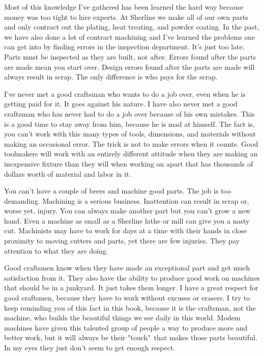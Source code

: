 
Most of this knowledge I've gathered has been learned the hard way because money
was too tight to hire experts. At Sherline we make all of our own parts and only
contract out the plating, heat treating, and powder coating. In the past, we
have also done a lot of contract machining and I've learned the problems one can
get into by finding errors in the inspection department. It's just too late.
Parts must be inspected as they are built, not after. Errors found after the
parts are made mean you start over. Design errors found after the parts are made
will always result in scrap. The only difference is who pays for the scrap.


I've never met a good craftsman who wants to do a job over, even when he is
getting paid for it. It goes against his nature. I have also never met a good
craftsman who has never had to do a job over because of his own mistakes. This
is a good time to stay away from him, because he is mad at himself. The fact is,
you can't work with this many types of tools, dimensions, and materials without
making an occasional error. The trick is not to make errors when it counts. Good
toolmakers will work with an entirely different attitude when they are making an
inexpensive fixture than they will when working on apart that has thousands of
dollars worth of material and labor in it.


You can't have a couple of beers and machine good parts. The job is too
demanding. Machining is a serious business. Inattention can result in scrap or,
worse yet, injury. You can always make another part but you can't grow a new
hand. Even a machine as small as a Sherline lathe or mill can give you a nasty
cut. Machinists may have to work for days at a time with their hands in close
proximity to moving cutters and parts, yet there are few injuries. They pay
attention to what they are doing.


Good craftsmen know when they have made an exceptional part and get much
satisfaction from it. They also have the ability to produce good work on
machines that should be in a junkyard. It just takes them longer. I have a great
respect for good craftsmen, because they have to work without excuses or
erasers. I try to keep reminding you of this fact in this book, because it is
the craftsman, not the machine, who builds the beautiful things we see daily in
this world. Modem machines have given this talented group of people a way to
produce more and better work, but it will always be their "touch"\ that makes
those parts beautiful. In my eyes they just don't seem to get enough respect.

